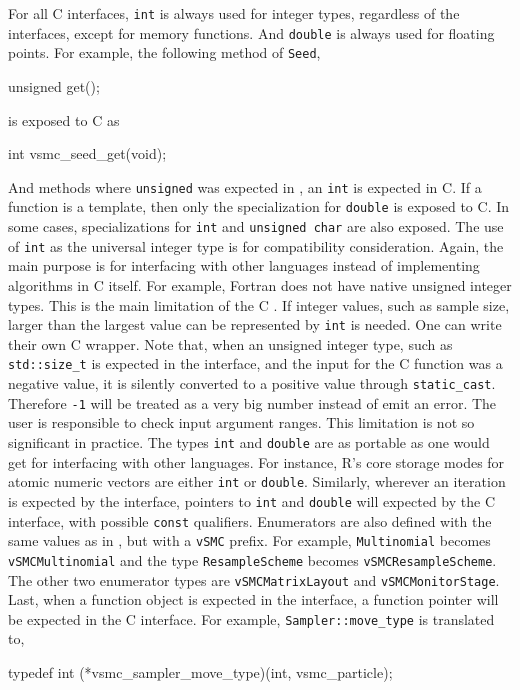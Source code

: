 For all C interfaces, \verb|int| is always used for integer types, regardless
of the \cpp interfaces, except for memory functions. And \verb|double| is
always used for floating points. For example, the following method of
\verb|Seed|,
\begin{cppcode}
  unsigned get();
\end{cppcode}
is exposed to C as
\begin{ccode}
  int vsmc_seed_get(void);
\end{ccode}
And \rng methods where \verb|unsigned| was expected in \cpp, an \verb|int| is
expected in C. If a function is a template, then only the specialization for
\verb|double| is exposed to C. In some cases, specializations for \verb|int|
and \verb|unsigned char| are also exposed. The use of \verb|int| as the
universal integer type is for compatibility consideration. Again, the main
purpose is for interfacing with other languages instead of implementing
algorithms in C itself. For example, Fortran does not have native unsigned
integer types. This is the main limitation of the C \api. If integer values,
such as sample size, larger than the largest value can be represented by
\verb|int| is needed. One can write their own C wrapper. Note that, when an
unsigned integer type, such as \verb|std::size_t| is expected in the \cpp
interface, and the input for the C function was a negative value, it is
silently converted to a positive value through \verb|static_cast|. Therefore
\verb|-1| will be treated as a very big number instead of emit an error. The
user is responsible to check input argument ranges. This limitation is not so
significant in practice. The types \verb|int| and \verb|double| are as portable
as one would get for interfacing with other languages. For instance, R's core
storage modes for atomic numeric vectors are either \verb|int| or
\verb|double|. Similarly, wherever an iteration is expected by the \cpp
interface, pointers to \verb|int| and \verb|double| will expected by the C
interface, with possible \verb|const| qualifiers. Enumerators are also defined
with the same values as in \cpp, but with a \verb|vSMC| prefix. For example,
\verb|Multinomial| becomes \verb|vSMCMultinomial| and the type
\verb|ResampleScheme| becomes \verb|vSMCResampleScheme|. The other two
enumerator types are \verb|vSMCMatrixLayout| and \verb|vSMCMonitorStage|.
Last, when a function object is expected in the \cpp interface, a function
pointer will be expected in the C interface. For example,
\verb|Sampler::move_type| is translated to,
\begin{ccode}
  typedef int (*vsmc_sampler_move_type)(int, vsmc_particle);
\end{ccode}

